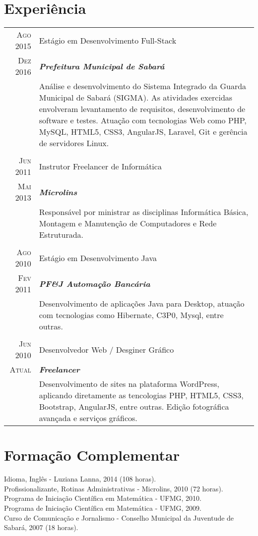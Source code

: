 \documentclass[a4paper,10pt]{article}
\begin{document}
\section{Experiência}
\begin{tabular}{r|p{13.1cm}}
	\textsc{Ago 2015} & Estágio em Desenvolvimento Full-Stack \\
	\textsc{Dez 2016}&\emph{\textbf{Prefeitura Municipal de Sabará}}\\
		 &\footnotesize{Análise e desenvolvimento do Sistema Integrado da Guarda Municipal de Sabará (SIGMA). As atividades exercidas envolveram levantamento de requisitos, desenvolvimento de software e testes. Atuação com tecnologias Web como PHP, MySQL, HTML5, CSS3, AngularJS, Laravel, Git e gerência de servidores Linux.}\\
	\multicolumn{2}{c}{} \\
	\textsc{Jun 2011} & Instrutor Freelancer de Informática \\
	\textsc{Mai 2013} & \emph{\textbf{Microlins}}\\
		 &\footnotesize{Responsável por ministrar as disciplinas Informática Básica, Montagem e Manutenção de Computadores e Rede Estruturada.}\\
	\multicolumn{2}{c}{} \\
	\textsc{Ago 2010} & Estágio em Desenvolvimento Java\\
	\textsc{Fev 2011}&\emph{\textbf{PF\&J Automação Bancária}}\\
		& \footnotesize{Desenvolvimento de aplicações Java para Desktop, atuação com tecnologias como Hibernate, C3P0, Mysql, entre outras.}\\
	\multicolumn{2}{c}{} \\
	\textsc{Jun 2010} & Desenvolvedor Web / Desginer Gráfico\\
		\textsc{Atual}&\emph{\textbf{Freelancer}}\\
		&\footnotesize{Desenvolvimento de sites na plataforma WordPress, aplicando diretamente as tencologias PHP, HTML5, CSS3, Bootstrap, AngularJS, entre outras. Edição fotográfica avançada e serviços gráficos.}\\
\end{tabular}

\section{Formação Complementar}
Idioma, Inglês - Luziana Lanna, \textsc{2014} (108 horas).\\
Profissionalizante, Rotinas Administrativas - Microlins, \textsc{2010} (72 horas).\\
Programa de Iniciação Científica em Matemática - UFMG, 2010.\\
Programa de Iniciação Científica em Matemática - UFMG, 2009.\\
Curso de Comunicação e Jornalismo - Conselho Municipal da Juventude de Sabará, 2007 (18 horas).
\end{document}
